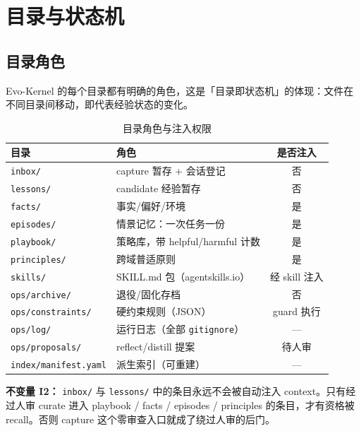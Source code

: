 \documentclass[12pt,a4paper]{ctexart}
\begin{document}
\section{目录与状态机}

\subsection{目录角色}

Evo-Kernel 的每个目录都有明确的角色，这是「目录即状态机」的体现：文件在不同目录间移动，即代表经验状态的变化。

\begin{table}[H]
\centering
\caption{目录角色与注入权限}
\begin{tabular}{@{}llc@{}}
\toprule
\textbf{目录} & \textbf{角色} & \textbf{是否注入} \\
\midrule
\texttt{inbox/} & capture 暂存 + 会话登记 & \textcolor{evored}{否} \\
\texttt{lessons/} & candidate 经验暂存 & \textcolor{evored}{否} \\
\texttt{facts/} & 事实/偏好/环境 & \textcolor{evogreen}{是} \\
\texttt{episodes/} & 情景记忆：一次任务一份 & \textcolor{evogreen}{是} \\
\texttt{playbook/} & 策略库，带 helpful/harmful 计数 & \textcolor{evogreen}{是} \\
\texttt{principles/} & 跨域普适原则 & \textcolor{evogreen}{是} \\
\texttt{skills/} & SKILL.md 包（agentskills.io） & 经 skill 注入 \\
\texttt{ops/archive/} & 退役/固化存档 & \textcolor{evored}{否} \\
\texttt{ops/constraints/} & 硬约束规则（JSON） & guard 执行 \\
\texttt{ops/log/} & 运行日志（全部 \texttt{gitignore}） & — \\
\texttt{ops/proposals/} & reflect/distill 提案 & 待人审 \\
\texttt{index/manifest.yaml} & 派生索引（可重建） & — \\
\bottomrule
\end{tabular}
\end{table}

\begin{redbox}
\textbf{不变量 I2：} \texttt{inbox/} 与 \texttt{lessons/} 中的条目永远不会被自动注入 context。只有经过人审 curate 进入 playbook / facts / episodes / principles 的条目，才有资格被 recall。否则 capture 这个零审查入口就成了绕过人审的后门。
\end{redbox}
\end{document}
